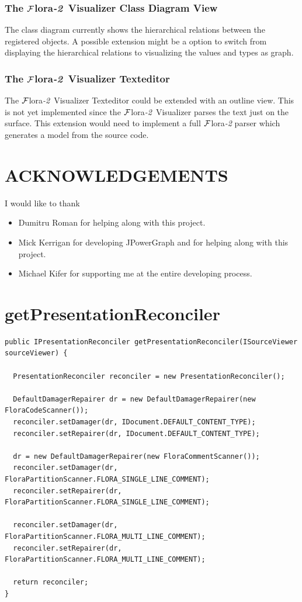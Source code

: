 \documentclass[a4paper,11pt]{article}
\newcommand{\FLORA}{{\mbox{\sc ${\cal F}${lora}\rm\emph{-2}}}\xspace}
\newcommand{\FVIZ}{{\mbox{\sc ${\cal F}${lora}\rm\emph{-2} {Visualizer}}}\xspace}
\begin{document}
\subsubsection{The \FVIZ Class Diagram View}
The class diagram currently shows the hierarchical relations between
the registered objects. A possible extension might be a option to switch
from displaying the hierarchical relations to visualizing the values
and types as graph.

\subsubsection{The \FVIZ Texteditor}
The \FVIZ Texteditor could be extended with an outline view. This is
not yet implemented since the \FVIZ parses the text just on the surface.
This extension would need to implement a full \FLORA parser which
generates a model from the source code.

\section{ACKNOWLEDGEMENTS}

I would like to thank
\begin{itemize}
  \item Dumitru Roman for helping along with this project.
  \item Mick Kerrigan for developing JPowerGraph and for helping along with this project.
  \item Michael Kifer for supporting me at the entire developing process.
\end{itemize}

\appendix

\section{getPresentationReconciler}
\label{appendix:getPresentationReconciler}
\begin{verbatim}
public IPresentationReconciler getPresentationReconciler(ISourceViewer sourceViewer) {

  PresentationReconciler reconciler = new PresentationReconciler();

  DefaultDamagerRepairer dr = new DefaultDamagerRepairer(new FloraCodeScanner());
  reconciler.setDamager(dr, IDocument.DEFAULT_CONTENT_TYPE);
  reconciler.setRepairer(dr, IDocument.DEFAULT_CONTENT_TYPE);

  dr = new DefaultDamagerRepairer(new FloraCommentScanner());
  reconciler.setDamager(dr, FloraPartitionScanner.FLORA_SINGLE_LINE_COMMENT);
  reconciler.setRepairer(dr, FloraPartitionScanner.FLORA_SINGLE_LINE_COMMENT);

  reconciler.setDamager(dr, FloraPartitionScanner.FLORA_MULTI_LINE_COMMENT);
  reconciler.setRepairer(dr, FloraPartitionScanner.FLORA_MULTI_LINE_COMMENT);

  return reconciler;
}
\end{verbatim}
\end{document}
